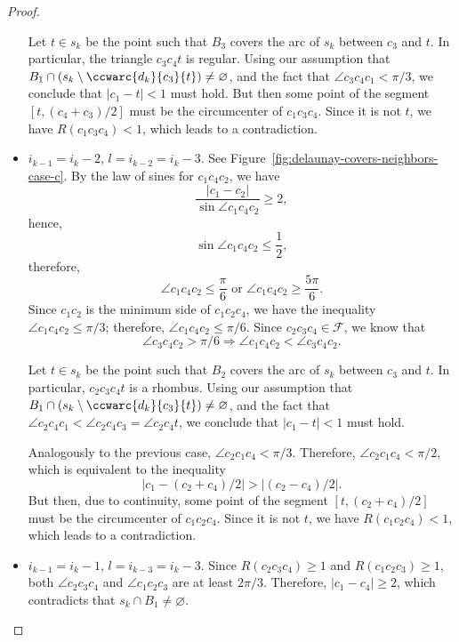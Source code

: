 \begin{appendices}
\begin{proof}
\begin{itemize}
    Let $t\in s_k$ be the point such that $B_3$ covers the arc of $s_k$ between $c_3$ and $t$. In particular, the triangle $c_3c_4t$ is regular. Using our assumption that
    $B_1\cap(s_k\setminus\ccwarc{d_k}{c_3}{t})\neq\varnothing$,
    and the fact that $\angle c_3c_4c_1 < \pi/3$, we conclude that $|c_1 - t| < 1$ must hold. But then some point of the segment $[t, (c_4 + c_3)/2]$ must be the circumcenter of $c_1c_3c_4$. Since it is not $t$, we have $R(c_1c_3c_4) < 1$, which leads to a contradiction.
    \item $i_{k-1} = i_k - 2$, $l = i_{k-2} = i_k - 3$. See Figure~\ref{fig:delaunay-covers-neighbors-case-c}. By the law of sines for $c_1c_4c_2$, we have
    $$\frac{|c_1 - c_2|}{\sin\angle c_1c_4c_2}\geq 2,$$
    hence,
    $$\sin\angle c_1c_4c_2 \leq \frac{1}{2},$$
    therefore,
    $$\angle c_1c_4c_2 \leq \frac{\pi}{6}\text{ or }\angle c_1c_4c_2 \geq \frac{5\pi}{6}.$$
    Since $c_1c_2$ is the minimum side of $c_1c_2c_4$, we have the inequality $\angle c_1c_4c_2\leq\pi/3$; therefore, $\angle c_1c_4c_2\leq\pi/6$. Since $c_2c_3c_4\in\mathcal{F}$, we know that
    $$\angle c_3c_4c_2 > \pi/6\Rightarrow \angle c_1c_4c_2 < \angle c_3c_4c_2.$$
    
    Let $t\in s_k$ be the point such that $B_2$ covers the arc of $s_k$ between $c_3$ and $t$. In particular, $c_2c_3c_4t$ is a rhombus. Using our assumption that
    $B_1\cap(s_k\setminus\ccwarc{d_k}{c_3}{t})\neq\varnothing$,
    and the fact that $\angle c_2c_4c_1 < \angle c_2c_4c_3 = \angle c_2c_4t$, we conclude that $|c_1 - t| < 1$ must hold.
    
    Analogously to the previous case, $\angle{c_2c_1c_4} < \pi/3$. Therefore, $\angle c_2c_1c_4 < \pi/2$, which is equivalent to the inequality
    $$|c_1 - (c_2 + c_4)/2| > |(c_2 - c_4)/2|.$$
    But then, due to continuity, some point of the segment $[t, (c_2 + c_4)/2]$ must be the circumcenter of $c_1c_2c_4$. Since it is not $t$, we have $R(c_1c_2c_4) < 1$, which leads to a contradiction.
    \item $i_{k-1} = i_k - 1$, $l = i_{k-3} = i_k - 3$. Since $R(c_2c_3c_4)\geq 1$ and $R(c_1c_2c_3)\geq 1$, both $\angle c_2c_3c_4$ and $\angle c_1c_2c_3$ are at least $2\pi/3$. Therefore, $|c_1 - c_4|\geq 2$, which contradicts that $s_k\cap B_1\neq\varnothing$.
\end{itemize}


\end{proof}
\end{appendices}
